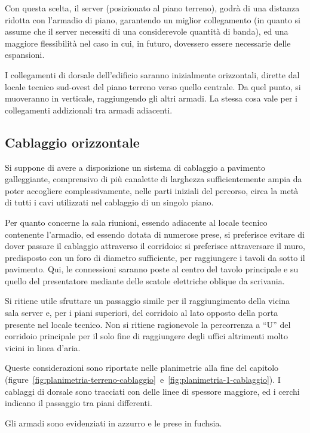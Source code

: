 Con questa scelta, il server (posizionato al piano terreno), godrà di una distanza ridotta con l'armadio di piano, garantendo
un miglior collegamento (in quanto si assume che il server necessiti di una considerevole quantità di banda), ed una maggiore
flessibilità nel caso in cui, in futuro, dovessero essere necessarie delle espansioni.

I collegamenti di dorsale dell'edificio saranno inizialmente orizzontali, dirette dal locale tecnico sud-ovest del piano terreno
verso quello centrale. Da quel punto, si muoveranno in verticale, raggiungendo gli altri armadi. La stessa cosa vale per i collegamenti
addizionali tra armadi adiacenti.

\subsection{Cablaggio orizzontale}

Si suppone di avere a disposizione un sistema di cablaggio a pavimento galleggiante, comprensivo di più canalette di larghezza sufficientemente
ampia da poter accogliere complessivamente, nelle parti iniziali del percorso, circa la metà di tutti i cavi utilizzati nel cablaggio di un singolo piano.

Per quanto concerne la sala riunioni, essendo adiacente al locale tecnico contenente l'armadio, ed essendo dotata di numerose prese,
si preferisce evitare di dover passare il cablaggio attraverso il corridoio: si preferisce attraversare il muro, predisposto con
un foro di diametro sufficiente, per raggiungere i tavoli da sotto il pavimento. Qui, le connessioni saranno poste al centro del tavolo principale
e su quello del presentatore mediante delle scatole elettriche oblique da scrivania.

Si ritiene utile sfruttare un passaggio simile per il raggiungimento della vicina sala server e, per i piani superiori,
del corridoio al lato opposto della porta presente nel locale tecnico. Non si ritiene ragionevole la percorrenza a ``U'' del corridoio
principale per il solo fine di raggiungere degli uffici altrimenti molto vicini in linea d'aria.

Queste considerazioni sono riportate nelle planimetrie alla fine del capitolo (figure~\ref{fig:planimetria-terreno-cablaggio}~e~\ref{fig:planimetria-1-cablaggio}).
I cablaggi di dorsale sono tracciati con delle linee di spessore maggiore, ed i cerchi indicano il passaggio tra piani differenti.

Gli armadi sono evidenziati in azzurro e le prese in fuchsia.

